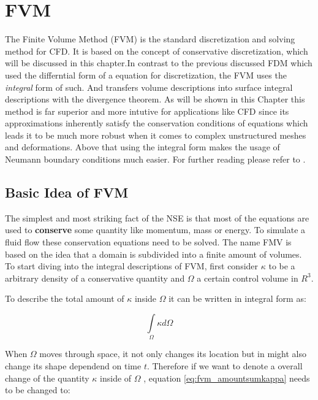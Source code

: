 \section{FVM}

The Finite Volume Method (FVM) is the standard discretization and solving method for 
CFD. It is based on the concept of conservative discretization, which will be discussed in this chapter.In contrast to the previous discussed FDM which used the differntial form of a equation for discretization, the FVM uses the \emph{integral} form of such. And transfers volume descriptions into surface integral descriptions with the divergence theorem. As will be shown in this Chapter this method is far superior and more intutive for applications like CFD since its approximations inherently satisfy the conservation conditions of equations which leads it to be much more robust when it comes to complex unstructured meshes and deformations. Above that using the integral form makes the usage of Neumann boundary conditions much easier. For further reading please refer to \citep{Leveque2002}.


\subsection{Basic Idea of FVM}
The simplest and most striking fact of the NSE is that most of the equations are used to \textbf{conserve} some quantity like momentum, mass or energy. To simulate a fluid flow these conservation equations need to be solved. The name FMV is based on the idea that a domain is subdivided into a finite amount of volumes. To start diving into the integral descriptions of FVM, first consider $ \kappa $ to be a arbitrary density of a conservative quantity and $\Omega$ a certain control volume in $R^3$.   

To describe the total amount of $\kappa$ inside $\Omega$ it can be written in integral form as:

\begin{equation}\label{eq:fvm_amountsumkappa}
\int\limits_{\Omega} \kappa d \Omega
\end{equation}



When $\Omega$ moves through space, it not only changes its location but in might also change its shape dependend on time $t$. Therefore if we want to denote a overall change of the quantity $\kappa$ inside of $\Omega$ ,  equation \ref{eq:fvm_amountsumkappa} needs to be changed to:

